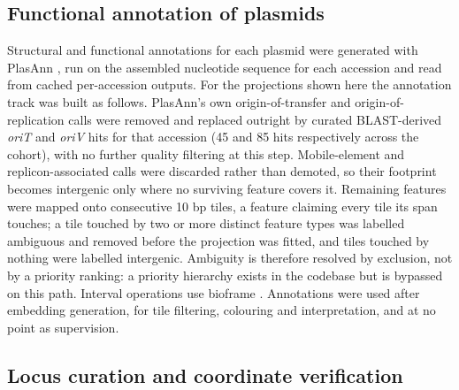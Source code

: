 \subsection*{Functional annotation of plasmids}

Structural and functional annotations for each plasmid were generated with
PlasAnn \cite{islam2026plasann},
run on the assembled nucleotide sequence for each accession and read from
cached per-accession outputs. For the projections shown here the annotation
track was built as follows. PlasAnn's own origin-of-transfer and
origin-of-replication calls were removed and replaced outright by curated
BLAST-derived \emph{oriT} and \emph{oriV} hits for that accession (45 and 85
hits respectively across the cohort), with no further quality filtering at
this step. Mobile-element and replicon-associated calls were discarded rather
than demoted, so their footprint becomes intergenic only where no surviving
feature covers it. Remaining features were mapped onto consecutive 10 bp
tiles, a feature claiming every tile its span touches; a tile touched by two
or more distinct feature types was labelled ambiguous and removed before the
projection was fitted, and tiles touched by nothing were labelled intergenic.
Ambiguity is therefore resolved by exclusion, not by a priority ranking: a
priority hierarchy exists in the codebase but is bypassed on this path.
Interval operations use bioframe \cite{open2c2024bioframe}.
Annotations were used after embedding generation, for tile filtering,
colouring and interpretation, and at no point as supervision.

\subsection*{Locus curation and coordinate verification}

